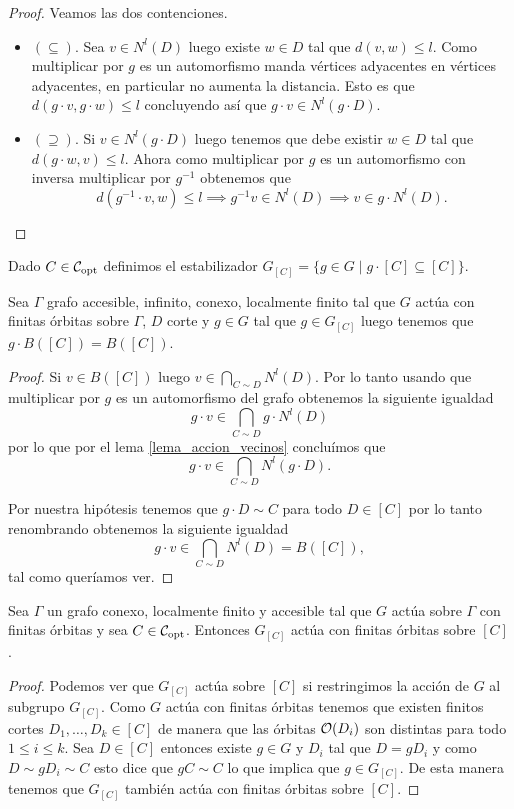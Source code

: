 \documentclass[tesis.tex]{subfiles}
\begin{document}
\begin{proof}
	Veamos las dos contenciones.
	
	\begin{itemize}
		\item $(\subseteq)$. 
		Sea $v \in N^l(D)$ luego existe $w \in D$ tal que $d(v,w) \le l$.
		Como multiplicar por $g$ es un automorfismo manda vértices adyacentes en vértices adyacentes, en particular no aumenta la distancia.
		Esto es que $d(g\cdot v,g\cdot w) \le l$ concluyendo así que $g \cdot v \in N^l(g \cdot D)$.  
		\item $(\supseteq)$.
		Si $v \in N^l(g\cdot D)$ luego tenemos que debe existir $w \in D$ tal que $d(g \cdot w, v) \le l$.
		Ahora como multiplicar por $g$ es un automorfismo con inversa multiplicar por $g^{-1}$ obtenemos que 
		\[
			d(g^{-1} \cdot v, w) \le l 
			\implies g^{-1}v \in N^l(D) \implies 
			 v \in g\cdot N^l(D).
		\]
	\end{itemize}
\end{proof}

Dado $C \in {\cal C}_{\text{opt}}$ definimos el estabilizador $G_{[C]} = \{ g \in G \mid g \cdot [C] \subseteq [C]  \}$.

\begin{lema}\label{lema_g_actua_b(C)}
	Sea $\Gamma$ grafo accesible, infinito, conexo, localmente finito tal que $G$ actúa con finitas órbitas sobre $\Gamma$, $D$ corte y $g \in G$ tal que $g \in G_{[C]}$ luego tenemos que 
	$g \cdot B([C]) = B([C])$.
\end{lema}
\begin{proof}
	Si $v \in B([C])$ luego $v \in \bigcap_{C \sim D} N^l(D)$.
	Por lo tanto usando que multiplicar por $g$ es un automorfismo del grafo obtenemos la siguiente igualdad
	\[
		g\cdot v \in \bigcap_{C \sim D} g \cdot N^l(D)
	\]
	por lo que por el lema \ref{lema_accion_vecinos} concluímos que 
	\[
		g\cdot v \in \bigcap_{C \sim D}   N^l(g\cdot D).
	\]	
	
	Por nuestra hipótesis tenemos que $g \cdot D \sim C$ para todo $D \in [C]$ por lo tanto renombrando obtenemos la siguiente igualdad
	\[
	g\cdot v \in \bigcap_{C \sim D}   N^l(D) = B([C]),
	\]
	tal como queríamos ver.
	
\end{proof}

\begin{lema}\label{lema_gC_actua_C}
	Sea $\Gamma$ un grafo conexo, localmente finito y accesible tal que $G$ actúa sobre $\Gamma$ con finitas órbitas y sea $C \in {\cal C}_{\text{opt}}$.
	Entonces $G_{[C]}$ actúa con finitas órbitas sobre $[C]$.
\end{lema}
\begin{proof}
	Podemos ver que $G_{[C]}$ actúa sobre $[C]$ si restringimos la acción de $G$ al subgrupo $G_{[C]}$.
	Como $G$ actúa con finitas órbitas tenemos que existen finitos cortes $D_{1}, \dots, D_{k} \in [C]$ de manera que las órbitas ${\cal O}(D_{i})$ son distintas para todo $1 \le i \le k$.
	Sea $D \in [C]$ entonces existe $g \in G$ y $D_{i}$ tal que $D = gD_{i}$ y como $D \sim gD_{i} \sim C$ esto dice que $gC \sim C$ lo que implica que 
	$g \in G_{[C]}$.
	De esta manera tenemos que $G_{[C]}$ también actúa con finitas órbitas sobre $[C]$. 
\end{proof}
\end{document}

